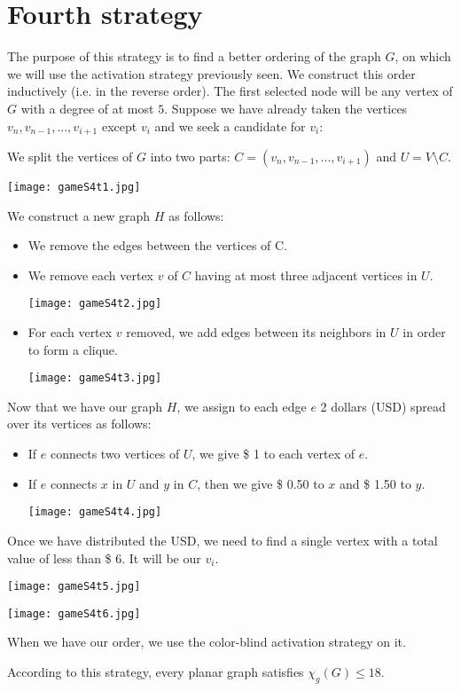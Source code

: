 \section{Fourth strategy}

The purpose of this strategy is to find a better ordering of the graph $G$, on which we will use the activation strategy previously seen. We construct this order inductively (i.e. in the reverse order). The first selected node will be any vertex of $G$ with a degree of at most $5$.
Suppose we have already taken the vertices $v_{n}, v_{n-1}, ..., v_{i+1}$ except $v_{i}$ and we seek a candidate for $v_{i}$:

We split the vertices of $G$ into two parts: $C = (v_{n}, v_{n-1}, ..., v_{i+1})$ and $U = V \setminus C$.

\texttt{[image: gameS4t1.jpg]}

We construct a new graph $H$ as follows:
\begin{itemize}
\item We remove the edges between the vertices of C.
\item We remove each vertex $v$ of $C$ having at most three adjacent vertices in $U$.

\texttt{[image: gameS4t2.jpg]}

\item For each vertex $v$ removed, we add edges between its neighbors in $U$ in order to form a clique.

\texttt{[image: gameS4t3.jpg]}

\end{itemize}

Now that we have our graph $H$, we assign to each edge $e$ 2 dollars (USD) spread over its vertices as follows:
\begin{itemize}
\item If $e$ connects two vertices of $U$, we give \$ 1 to each vertex of $e$.
\item If $e$ connects $x$ in $U$ and $y$ in $C$, then we give \$ 0.50 to $x$ and \$ 1.50 to $y$.

\texttt{[image: gameS4t4.jpg]}

\end{itemize}

Once we have distributed the USD, we need to find a single vertex with a total value of less than \$ 6.
It will be our $v_{i}$.

\texttt{[image: gameS4t5.jpg]}

\texttt{[image: gameS4t6.jpg]}

When we have our order, we use the color-blind activation strategy on it.

According to this strategy, every planar graph satisfies $\chi_{g}(G) \leq 18$.